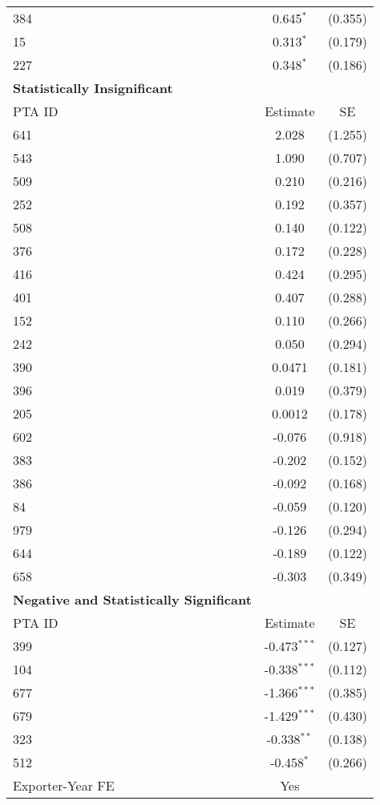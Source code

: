 \begin{table}[htbp]
\begin{adjustbox}{max width=\textwidth}
\begin{tabular}{lcc}
    384  & 0.645$^{\ast}$ & (0.355) \\
    15  & 0.313$^{\ast}$ & (0.179) \\
    227 & 0.348$^{\ast}$ & (0.186) \\
    \hline
    \textbf{Statistically Insignificant} &  &  \\
    \hline
    PTA ID & Estimate & SE \\
    \hline
    641 & 2.028 & (1.255) \\
    543 & 1.090 & (0.707) \\
    509 & 0.210 & (0.216) \\
    252 & 0.192 & (0.357) \\
    508 & 0.140 & (0.122) \\
    376 & 0.172 & (0.228) \\
    416 & 0.424 & (0.295) \\
    401 & 0.407 & (0.288) \\
    152 & 0.110 & (0.266) \\
    242 & 0.050 & (0.294) \\
    390 & 0.0471 & (0.181) \\
    396 & 0.019 & (0.379) \\
    205 & 0.0012 & (0.178) \\
    602 & -0.076 & (0.918) \\
    383 & -0.202 & (0.152) \\
    386 & -0.092 & (0.168) \\
    84  & -0.059 & (0.120) \\
    979  & -0.126 & (0.294) \\
    644  & -0.189 & (0.122) \\
    658  & -0.303 & (0.349) \\
    \hline
    \textbf{Negative and Statistically Significant} &  &  \\
    \hline
    PTA ID & Estimate & SE \\
    \hline
    399 & -0.473$^{\ast\ast\ast}$ & (0.127) \\
    104 & -0.338$^{\ast\ast\ast}$ & (0.112) \\
    677 & -1.366$^{\ast\ast\ast}$ & (0.385) \\
    679 & -1.429$^{\ast\ast\ast}$ & (0.430) \\
    323 & -0.338$^{\ast\ast}$ & (0.138) \\
    512 & -0.458$^{\ast}$ & (0.266) \\
    \hline
    Exporter-Year FE & Yes \\

\end{tabular}
\end{adjustbox}
\end{table}
